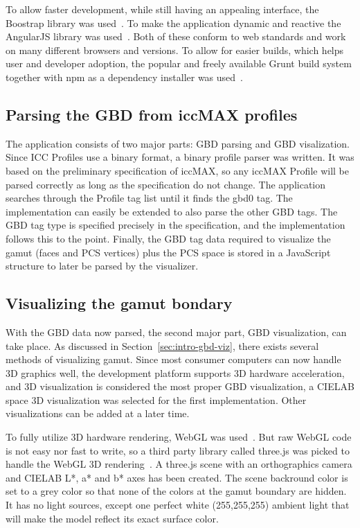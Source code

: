 To allow faster development, while still having an appealing interface, the Boostrap library was used~\cite{Bootstrap}.
To make the application dynamic and reactive the AngularJS library was used~\cite{Angular}.
Both of these conform to web standards and work on many different browsers and versions.
To allow for easier builds, which helps user and developer adoption, the popular and freely available Grunt build system together with npm as a dependency installer was used~\cite{Grunt,Npm}.

\subsection{Parsing the GBD from iccMAX profiles}
The application consists of two major parts: GBD parsing and GBD visalization.
Since ICC Profiles use a binary format, a binary profile parser was written.
It was based on the preliminary specification of iccMAX, so any iccMAX Profile will be parsed correctly as long as the specification do not change.
The application searches through the Profile tag list until it finds the gbd0 tag.
The implementation can easily be extended to also parse the other GBD tags.
The GBD tag type is specified precisely in the specification, and the implementation follows this to the point.
Finally, the GBD tag data required to visualize the gamut (faces and PCS vertices) plus the PCS space is stored in a JavaScript structure to later be parsed by the visualizer.

\subsection{Visualizing the gamut bondary}
With the GBD data now parsed, the second major part, GBD visualization, can take place.
As discussed in Section~\ref{sec:intro-gbd-viz}, there exists several methods of visualizing gamut.
Since most consumer computers can now handle 3D graphics well, the development platform supports 3D hardware acceleration, and 3D visualization is considered the most proper GBD visualization, a CIELAB space 3D visualization was selected for the first implementation.
Other visualizations can be added at a later time.

To fully utilize 3D hardware rendering, WebGL was used~\cite{WebGl}.
But raw WebGL code is not easy nor fast to write, so a third party library called three.js was picked to handle the WebGL 3D rendering~\cite{ThreeJs}.
A three.js scene with an orthographics camera and CIELAB L*, a* and b* axes has been created.
The scene backround color is set to a grey color so that none of the colors at the gamut boundary are hidden.
It has no light sources, except one perfect white (255,255,255) ambient light that will make the model reflect its exact surface color.

